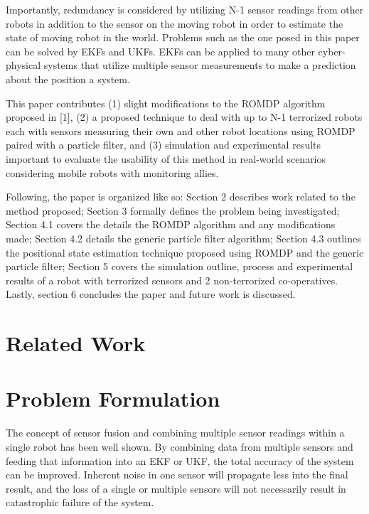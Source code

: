 \documentclass[conference]{IEEEtran}
\begin{document}
\par
Importantly, redundancy is considered by utilizing N-1 sensor readings from other robots in addition to the
sensor on the moving robot in order to estimate the state of moving robot in the world. Problems such as the one posed in this paper can be solved by EKFs and UKFs. EKFs can be applied to many other cyber-physical systems that utilize multiple sensor measurements to make a prediction about the position a system.
\par
This paper contributes (1) slight modifications to the ROMDP algorithm proposed in [1], (2) a proposed technique
to deal with up to N-1 terrorized robots each with sensors measuring their own and other robot locations
using ROMDP paired with a particle filter, and (3) simulation and experimental results important to evaluate
the usability of this method in real-world scenarios considering mobile robots with monitoring allies.
\par
Following, the paper is organized like so: Section 2 describes work related to the method proposed; Section 3
formally defines the problem being investigated; Section 4.1 covers the details the ROMDP algorithm and any
modifications made; Section 4.2 details the generic particle filter algorithm; Section 4.3 outlines the positional
state estimation technique proposed using ROMDP and the generic particle filter; Section 5 covers the
simulation outline, process and experimental results of a robot with terrorized sensors and 2 non-terrorized
co-operatives. Lastly, section 6 concludes the paper and future work is discussed.

\section{Related Work}


\section{Problem Formulation}
The concept of sensor fusion and combining multiple sensor readings within a single robot has been well shown.
By combining data from multiple sensors and feeding that information into an EKF or UKF, the total accuracy of the
system can be improved.
Inherent noise in one sensor will propagate less into the final result, and the loss of a single or multiple sensors
will not necessarily result in catastrophic failure of the system.
\end{document}
